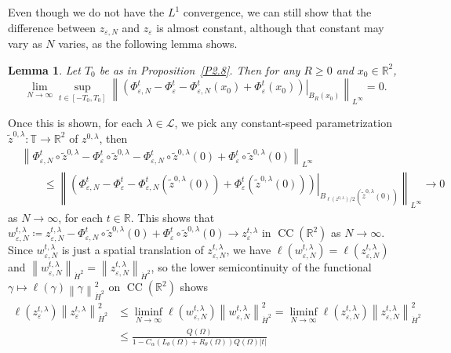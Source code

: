\documentclass[reqno,centertags,12pt]{amsart}
\newtheorem{lemma}[theorem]{Lemma}
\theoremstyle{definition}
\numberwithin{equation}{section}
\newcommand{\abs}[1]{\left\lvert#1\right\rvert}
\newcommand{\norm}[1]{\left\|#1\right\|}
\newcommand{\bbR}{{\mathbb{R}}}
\newcommand{\bbT}{{\mathbb{T}}}
\newcommand{\eps}{\varepsilon}
\newcommand{\tht}{\theta}
\begin{document}
Even though we do not have the $L^{1}$ convergence, we can still show that
the difference between $z_{\eps,N}$ and $z_{\eps}$ is almost constant,
although that constant may vary as $N$ varies, as the following lemma shows.

\begin{lemma}\label{L3.8}
    Let $T_{0}$ be as in Proposition~\ref{P2.8}.
    Then for any $R\geq 0$ and $x_{0}\in\bbR^{2}$,
    \[
        \lim_{N\to\infty}\sup_{t\in[-T_{0},T_{0}]}\norm{\left.\left(
            \Phi_{\eps,N}^{t} - \Phi_{\eps}^{t}
            - \Phi_{\eps,N}^{t}(x_{0}) + \Phi_{\eps}^{t}(x_{0})
        \right)\right|_{B_{R}(x_{0})}}_{L^{\infty}} = 0.
    \]
\end{lemma}

Once this is shown, for each $\lambda\in\mathcal{L}$,
we pick any constant-speed parametrization $\tilde{z}^{0,\lambda}\colon\bbT\to\bbR^{2}$
of $z^{0,\lambda}$, then
\begin{align*}
    &\norm{\Phi_{\eps,N}^{t}\circ\tilde{z}^{0,\lambda}
    - \Phi_{\eps}^{t}\circ\tilde{z}^{0,\lambda}
    - \Phi_{\eps,N}^{t}\circ\tilde{z}^{0,\lambda}(0)
    + \Phi_{\eps}^{t}\circ\tilde{z}^{0,\lambda}(0)}_{L^{\infty}}
    \\&\quad\quad
    \leq \norm{\left.\left(
        \Phi_{\eps,N}^{t} - \Phi_{\eps}^{t}
        - \Phi_{\eps,N}^{t}(\tilde{z}^{0,\lambda}(0))
        + \Phi_{\eps}^{t}(\tilde{z}^{0,\lambda}(0))
    \right)\right|_{B_{\ell(z^{0,\lambda})/2}(\tilde{z}^{0,\lambda}(0))}}_{L^{\infty}} \to 0
\end{align*}
as $N\to\infty$, for each $t\in\bbR$. This shows that
$w_{\eps,N}^{t,\lambda}\coloneqq z_{\eps,N}^{t,\lambda}
- \Phi_{\eps,N}^{t}\circ\tilde{z}^{0,\lambda}(0)
+ \Phi_{\eps}^{t}\circ\tilde{z}^{0,\lambda}(0) \to z_{\eps}^{t,\lambda}$
in $\operatorname{CC}(\bbR^{2})$ as $N\to\infty$.
Since $w_{\eps,N}^{t,\lambda}$ is just a spatial translation of $z_{\eps,N}^{t,\lambda}$,
we have $\ell(w_{\eps,N}^{t,\lambda}) = \ell(z_{\eps,N}^{t,\lambda})$
and $\norm{w_{\eps,N}^{t,\lambda}}_{\dot{H}^{2}} = \norm{z_{\eps,N}^{t,\lambda}}_{\dot{H}^{2}}$,
so the lower semicontinuity of the functional
$\gamma\mapsto\ell(\gamma)\norm{\gamma}_{\dot{H}^{2}}^{2}$
on $\operatorname{CC}(\bbR^{2})$ shows
\begin{align*}
    \ell(z_{\eps}^{t,\lambda})
    \norm{z_{\eps}^{t,\lambda}}_{\dot{H}^{2}}^{2}
    &\leq \liminf_{N\to\infty}\ell(w_{\eps,N}^{t,\lambda})
    \norm{w_{\eps,N}^{t,\lambda}}_{\dot{H}^{2}}^{2}
    = \liminf_{N\to\infty}\ell(z_{\eps,N}^{t,\lambda})
    \norm{z_{\eps,N}^{t,\lambda}}_{\dot{H}^{2}}^{2} \\
    &\leq \frac{Q(\Omega)}
    {1 - C_{\alpha}(L_{\tht}(\Omega) + R_{\tht}(\Omega))Q(\Omega)\abs{t}}
\end{align*}
\end{document}
